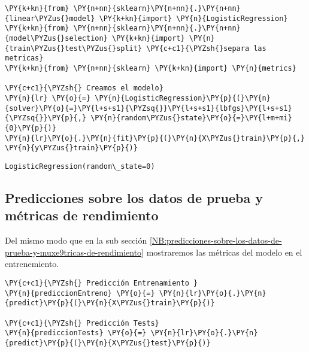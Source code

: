     \begin{tcolorbox}[breakable, size=fbox, boxrule=1pt, pad at break*=1mm,colback=cellbackground, colframe=cellborder]
\begin{Verbatim}[commandchars=\\\{\}]
\PY{k+kn}{from} \PY{n+nn}{sklearn}\PY{n+nn}{.}\PY{n+nn}{linear\PYZus{}model} \PY{k+kn}{import} \PY{n}{LogisticRegression}
\PY{k+kn}{from} \PY{n+nn}{sklearn}\PY{n+nn}{.}\PY{n+nn}{model\PYZus{}selection} \PY{k+kn}{import} \PY{n}{train\PYZus{}test\PYZus{}split} \PY{c+c1}{\PYZsh{}separa las metricas}
\PY{k+kn}{from} \PY{n+nn}{sklearn} \PY{k+kn}{import} \PY{n}{metrics}

\PY{c+c1}{\PYZsh{} Creamos el modelo}
\PY{n}{lr} \PY{o}{=} \PY{n}{LogisticRegression}\PY{p}{(}\PY{n}{solver}\PY{o}{=}\PY{l+s+s1}{\PYZsq{}}\PY{l+s+s1}{lbfgs}\PY{l+s+s1}{\PYZsq{}}\PY{p}{,} \PY{n}{random\PYZus{}state}\PY{o}{=}\PY{l+m+mi}{0}\PY{p}{)}
\PY{n}{lr}\PY{o}{.}\PY{n}{fit}\PY{p}{(}\PY{n}{X\PYZus{}train}\PY{p}{,} \PY{n}{y\PYZus{}train}\PY{p}{)}
\end{Verbatim}
\end{tcolorbox}

            \begin{tcolorbox}[breakable, size=fbox, boxrule=.5pt, pad at break*=1mm, opacityfill=0]
\begin{Verbatim}[commandchars=\\\{\}]
LogisticRegression(random\_state=0)
\end{Verbatim}
\end{tcolorbox}
        
    \hypertarget{predicciones-sobre-los-datos-de-prueba-y-muxe9tricas-de-rendimiento}{%
\subsection{Predicciones sobre los datos de prueba y métricas de rendimiento}\label{predicciones-sobre-los-datos-de-prueba-y-muxe9tricas-de-rendimiento}}

	Del mismo modo que en la sub sección \ref{NB:predicciones-sobre-los-datos-de-prueba-y-muxe9tricas-de-rendimiento} mostraremos las métricas del modelo en el entrenemiento.

    \begin{tcolorbox}[breakable, size=fbox, boxrule=1pt, pad at break*=1mm,colback=cellbackground, colframe=cellborder]
\begin{Verbatim}[commandchars=\\\{\}]
\PY{c+c1}{\PYZsh{} Predicción Entrenamiento }
\PY{n}{prediccionEntreno} \PY{o}{=} \PY{n}{lr}\PY{o}{.}\PY{n}{predict}\PY{p}{(}\PY{n}{X\PYZus{}train}\PY{p}{)}

\PY{c+c1}{\PYZsh{} Predicción Tests}
\PY{n}{prediccionTests} \PY{o}{=} \PY{n}{lr}\PY{o}{.}\PY{n}{predict}\PY{p}{(}\PY{n}{X\PYZus{}test}\PY{p}{)}
\end{Verbatim}
\end{tcolorbox}


